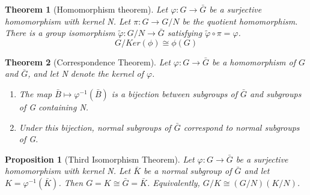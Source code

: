 \documentclass[12pt]{article}
\newtheorem{theorem}{Theorem}[subsection]
\newtheorem{proposition}{Proposition}[subsection]
\begin{document}
        \begin{theorem}[Homomorphism theorem]
        Let $\varphi: G \rightarrow\bar{G}$ be a surjective homomorphism with kernel N. Let $\pi: G \rightarrow G/N$ be the quotient homomorphism. There is a group isomorphism $\tilde{\varphi}: G/N \rightarrow \bar{G}$ satisfying $\tilde{\varphi} \circ \pi = \varphi$.
        \[G / Ker(\phi) \cong \phi(G)\]
        \end{theorem}
        \begin{theorem}[Correspondence Theorem]
        Let $\varphi: G \rightarrow \bar{G}$ be a homomorphism of $G$ and $\bar{G}$, and let N denote the kernel of $\varphi$.
        \begin{enumerate}
            \item The map $\bar{B} \mapsto \varphi^{-1}(\bar{B})$ is a bijection between subgroups of $\bar{G}$ and subgroups of G containing N.
            \item Under this bijection, normal subgroups of $\bar{G}$ correspond to normal subgroups of G.
        \end{enumerate}

        \end{theorem}
        \begin{proposition}[Third Isomorphism Theorem]
            Let $\varphi: G \rightarrow \bar{G}$ be a surjective homomorphism with kernel N. Let $\bar{K}$ be a normal subgroup of $\bar{G}$ and let $K = \varphi^{-1}(\bar{K})$. Then $G=K \cong \bar{G}=\bar{K}$. Equivalently, $G/K \cong(G/N)(K/N)$.
        \end{proposition}
\end{document}
